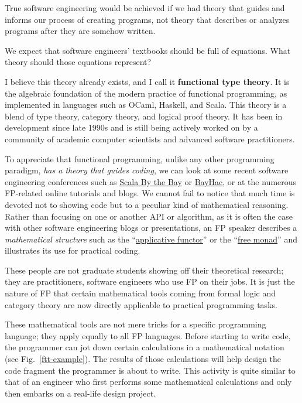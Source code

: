 True software engineering would be achieved if we had theory that
guides and informs our process of creating programs, \textendash{}
not theory that describes or analyzes programs after they are somehow
written.

We expect that software engineers' textbooks should be full of equations.
What theory should those equations represent?

I believe this theory already exists, and I call it \textbf{functional
type theory}. It is the algebraic foundation
of the modern practice of functional programming, as implemented in
languages such as OCaml, Haskell, and Scala. This theory is a blend
of type theory, category theory, and logical proof theory. It has
been in development since late 1990s and is still being actively worked
on by a community of academic computer scientists and advanced software
practitioners.

To appreciate that functional programming, unlike any other programming
paradigm, \emph{has a theory that guides coding}, we can look at some
recent software engineering conferences such as \href{http://2015.scala.bythebay.io/}{Scala By the Bay}
or \href{http://bayhac.org/}{BayHac}, or at the numerous FP-related
online tutorials and blogs. We cannot fail to notice that much time
is devoted not to showing code but to a peculiar kind of mathematical
reasoning. Rather than focusing on one or another API or algorithm,
as it is often the case with other software engineering blogs or presentations,
an FP speaker describes a \emph{mathematical structure} \textendash{}
such as the ``\href{http://www.youtube.com/watch?v=bmIxIslimVY}{applicative functor}''
or the ``\href{http://www.youtube.com/watch?v=U0lK0hnbc4U}{free monad}''
\textendash{} and illustrates its use for practical coding.

These people are not graduate students showing off their theoretical
research; they are practitioners, software engineers who use FP on
their jobs. It is just the nature of FP that certain mathematical
tools \textendash{} coming from formal logic and category theory \textendash{}
are now directly applicable to practical programming tasks.

These mathematical tools are not mere tricks for a specific programming
language; they apply equally to all FP languages. Before starting
to write code, the programmer can jot down certain calculations in
a mathematical notation (see Fig.\ \ref{ftt-example}). The results
of those calculations will help design the code fragment the programmer
is about to write. This activity is quite similar to that of an engineer
who first performs some mathematical calculations and only then embarks
on a real-life design project.

